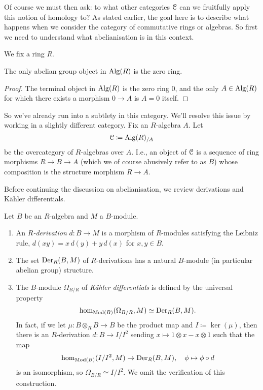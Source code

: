 Of course we must then ask: to what other categories $\mathcal{C}$ can we
fruitfully apply this notion of homology to? As stated earlier, the
goal here is to describe what happens when we consider the category of
commutative rings or algebras. So first we need to understand what
abelianisation is in this context.

\begin{notation}
  We fix a ring $R$.
\end{notation}

\begin{proposition}
  The only abelian group object in $\mathrm{Alg}(R)$ is the zero ring.
\end{proposition}

\begin{proof}
  The terminal object in $\mathrm{Alg}(R)$ is the zero ring $0$, and the only
  $A \in \mathrm{Alg}(R)$ for which there exists a morphism $0 \to A$ is $A =
  0$ itself.
\end{proof}

\begin{nothing}
  So we've already run into a subtlety in this category. We'll resolve
  this issue by working in a slightly different category. Fix an
  $R$-algebra $A$. Let
  \[
  \mathcal{C} \coloneqq \mathrm{Alg}(R)_{/A}
  \]
  be the overcategory of $R$-algebras over $A$. I.e., an object of
  $\mathcal{C}$ is a sequence of ring morphisms $R \to B \to A$ (which we of
  course abusively refer to as $B$) whose composition is the structure
  morphism $R \to A$.
\end{nothing}

Before continuing the discussion on abelianisation, we review
derivations and K\"ahler differentials.

\begin{definitions}
  \label{derivations}
  Let $B$ be an $R$-algebra and $M$ a $B$-module.
  \begin{enumerate}[leftmargin=*]
  \item An \emph{$R$-derivation} $d : B \to M$ is a morphism of
    $R$-modules satisfying the Leibniz rule, $d(xy) = x\,d(y) +
    y\,d(x)$ for $x,y \in B$.
  \item The set $\operatorname{Der}_R(B,M)$ of $R$-derivations has a natural
    $B$-module (in particular abelian group) structure.
  \item \label{kahdiff} The $B$-module $\Omega_{B/R}$ of
    \emph{K\"ahler differentials} is defined by the universal property
    \[
    \operatorname{hom}_{\mathrm{Mod}(B)}(\Omega_{B/R}, M) \simeq \operatorname{Der}_R(B,M).
    \]
    In fact, if we let $\mu : B \otimes_R B \to B$ be the product map
    and $I \coloneqq \ker(\mu)$, then there is an $R$-derivation $d :
    B \to I/I^2$ sending $x \mapsto 1 \otimes x - x \otimes 1$ such
    that the map
    \[
    \operatorname{hom}_{\mathrm{Mod}(B)}(I/I^2, M) \to \operatorname{Der}_R(B,M), \quad \phi \mapsto \phi
    \circ d
    \]
    is an isomorphism, so $\Omega_{B/R} \simeq I/I^2$. We omit the
    verification of this construction.
  \end{enumerate}
\end{definitions}

